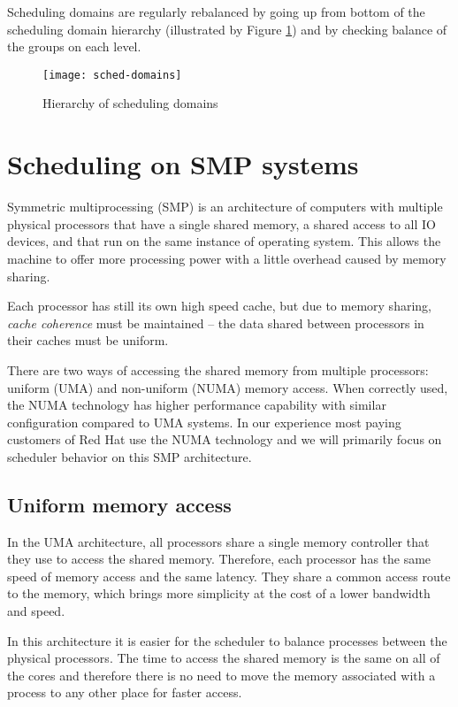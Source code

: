 Scheduling domains are regularly rebalanced by going up from bottom of the
scheduling domain hierarchy (illustrated by Figure \ref{fig:sched-domains}) and
by checking balance of the groups on each level.

\begin{figure}
  \centering
  \texttt{[image: sched-domains]}
  \caption{Hierarchy of scheduling domains\cite{sched-groups-lwn}}
  \label{fig:sched-domains}
\end{figure}

\section{Scheduling on SMP systems}
Symmetric multiprocessing (SMP) is an architecture of computers with multiple
physical processors that have a single shared memory, a shared access to all IO
devices, and that run on the same instance of operating system. This allows the
machine to offer more processing power with a little overhead caused by memory
sharing.

Each processor has still its own high speed cache, but due to memory sharing,
\emph{cache coherence} must be maintained -- the data shared between processors
in their caches must be uniform.

There are two ways of accessing the shared memory from multiple processors:
uniform (UMA) and non-uniform (NUMA) memory access. When correctly used, the
NUMA technology has higher performance capability with similar configuration
compared to UMA systems. In our experience most paying customers of Red Hat use
the NUMA technology and we will primarily focus on scheduler behavior on this
SMP architecture.

\subsection{Uniform memory access}
In the UMA architecture, all processors share a single memory controller that
they use to access the shared memory. Therefore, each processor has the same
speed of memory access and the same latency. They share a common access route to
the memory, which brings more simplicity at the cost of a lower bandwidth and
speed.

In this architecture it is easier for the scheduler to balance processes
between the physical processors. The time to access the shared memory is the
same on all of the cores and therefore there is no need to move the memory
associated with a process to any other place for faster access.


